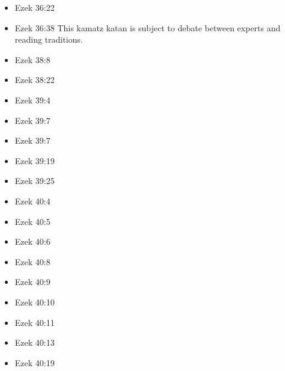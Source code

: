 \documentclass[14pt]{book}
\begin{document}
\begin{multicols}{2}
\begin{itemize}
														\item Ezek 36:22
														
														\item Ezek 36:38 This kamatz katan is subject to debate between experts and reading traditions.
														
														\item Ezek 38:8
														
														\item Ezek 38:22
														
														\item Ezek 39:4
														
														\item Ezek 39:7
														
														\item Ezek 39:7
														
														\item Ezek 39:19
														
														\item Ezek 39:25
														
														\item Ezek 40:4
														
														\item Ezek 40:5
														
														\item Ezek 40:6
														
														\item Ezek 40:8
														
														\item Ezek 40:9
														
														\item Ezek 40:10
														
														\item Ezek 40:11
														
														\item Ezek 40:13
														
														\item Ezek 40:19
														

\end{itemize}
\end{multicols}
\end{document}
